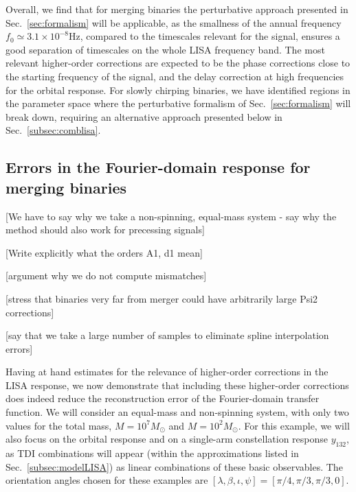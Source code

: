 \documentclass[aps,showpacs,twocolumn,
prd,superscriptaddress,nofootinbib]{revtex4-1}
\newcommand{\Msol}{M_{\odot}}
\newcommand{\SM}[1]{{\color{Red} #1}}
\begin{document}
Overall, we find that for merging binaries the perturbative approach presented in Sec.~\ref{sec:formalism} will be applicable, as the smallness of the annual frequency $f_{0} \simeq 3.1\times10^{-8}\mathrm{Hz}$, compared to the timescales relevant for the signal, ensures a good separation of timescales on the whole LISA frequency band. The most relevant higher-order corrections are expected to be the phase corrections close to the starting frequency of the signal, and the delay correction at high frequencies for the orbital response. For slowly chirping binaries, we have identified regions in the parameter space where the perturbative formalism of Sec.~\ref{sec:formalism} will break down, requiring an alternative approach presented below in Sec.~\ref{subsec:comblisa}.


\subsection{Errors in the Fourier-domain response for merging binaries}
\label{subsec:errorsLISA}

\SM{[We have to say why we take a non-spinning, equal-mass system - say why the method should also work for precessing signals]}

\SM{[Write explicitly what the orders A1, d1 mean]}

\SM{[argument why we do not compute mismatches]}

\SM{[stress that binaries very far from merger could have arbitrarily large Psi2 corrections]}

\SM{[say that we take a large number of samples to eliminate spline interpolation errors]}

Having at hand estimates for the relevance of higher-order corrections in the LISA response, we now demonstrate that including these higher-order corrections does indeed reduce the reconstruction error of the Fourier-domain transfer function. We will consider an equal-mass and non-spinning system, with only two values for the total mass, $M=10^{7} \Msol$ and $M=10^{2} \Msol$. For this example, we will also focus on the orbital response and on a single-arm constellation response $y_{132}$, as TDI combinations will appear (within the approximations listed in Sec.~\ref{subsec:modelLISA}) as linear combinations of these basic observables. The orientation angles chosen for these examples are $[\lambda,\beta,\iota,\psi] = [\pi/4,\pi/3,\pi/3,0]$.
\end{document}
